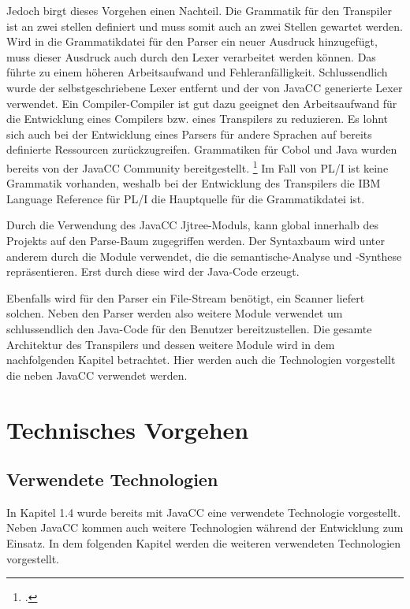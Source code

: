 Jedoch birgt dieses Vorgehen einen Nachteil. Die Grammatik für den Transpiler ist an zwei stellen definiert und muss somit auch an zwei Stellen gewartet werden.
Wird in die Grammatikdatei für den Parser ein neuer Ausdruck hinzugefügt, muss dieser Ausdruck auch durch den Lexer verarbeitet werden können.
Das führte zu einem höheren Arbeitsaufwand und Fehleranfälligkeit. Schlussendlich wurde der selbstgeschriebene Lexer entfernt und der von JavaCC generierte Lexer verwendet.
Ein Compiler-Compiler ist gut dazu geeignet den Arbeitsaufwand für die Entwicklung eines Compilers bzw. eines Transpilers zu reduzieren. 
Es lohnt sich auch bei der Entwicklung eines Parsers für andere Sprachen auf bereits definierte Ressourcen zurückzugreifen. 
Grammatiken für Cobol und Java wurden bereits von der JavaCC Community bereitgestellt. \footcite[Vgl. ][]{javaccdoku}
Im Fall von PL/I ist keine Grammatik vorhanden, weshalb bei der Entwicklung des Transpilers die IBM Language Reference für PL/I die Hauptquelle für die Grammatikdatei ist.   

Durch die Verwendung des JavaCC Jjtree-Moduls, kann global innerhalb des Projekts auf den Parse-Baum zugegriffen werden. 
Der Syntaxbaum wird unter anderem durch die Module verwendet, die die semantische-Analyse und -Synthese repräsentieren.
Erst durch diese wird der Java-Code erzeugt.

Ebenfalls wird für den Parser ein File-Stream benötigt, ein Scanner liefert solchen.
Neben den Parser werden also weitere Module verwendet um schlussendlich den Java-Code für den Benutzer bereitzustellen.
Die gesamte Architektur des Transpilers und dessen weitere Module wird in dem nachfolgenden Kapitel betrachtet. 
Hier werden auch die Technologien vorgestellt die neben JavaCC verwendet werden. 

\section{Technisches Vorgehen}
\subsection{Verwendete Technologien}
In Kapitel 1.4 wurde bereits mit JavaCC eine verwendete Technologie vorgestellt. Neben JavaCC kommen auch weitere Technologien während der Entwicklung zum Einsatz. In dem folgenden Kapitel werden die weiteren verwendeten Technologien vorgestellt.

